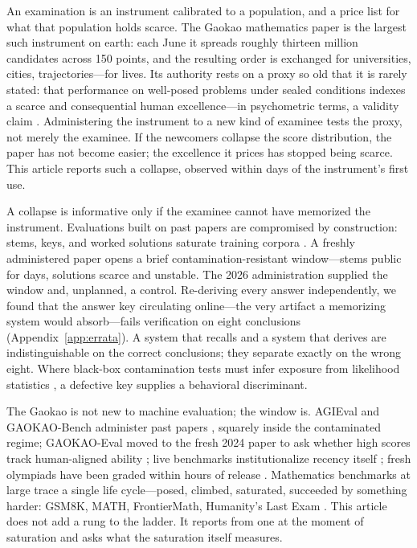 \documentclass[11pt]{article}
\theoremstyle{plain}
\begin{document}
An examination is an instrument calibrated to a population, and a price
list for what that population holds scarce. The Gaokao mathematics paper
is the largest such instrument on earth: each June it spreads roughly
thirteen million candidates across 150 points, and the resulting order is
exchanged for universities, cities, trajectories---for lives. Its
authority rests on a proxy so old that it is rarely stated: that
performance on well-posed problems under sealed conditions indexes a
scarce and consequential human excellence---in psychometric terms, a
validity claim \citep{cronbach1955construct}. Administering the instrument to
a new kind of examinee tests the proxy, not merely the examinee. If the
newcomers collapse the score distribution, the paper has not become
easier; the excellence it prices has stopped being scarce. This article
reports such a collapse, observed within days of the instrument's first
use.

A collapse is informative only if the examinee cannot have memorized the
instrument. Evaluations built on past papers are compromised by
construction: stems, keys, and worked solutions saturate training corpora
\citep{carlini2023quantifying,zhang2024careful}.
A freshly administered paper opens a brief contamination-resistant
window---stems public for days, solutions scarce and unstable. The 2026
administration supplied the window and, unplanned, a control. Re-deriving
every answer independently, we found that the answer key circulating
online---the very artifact a memorizing system would absorb---fails
verification on eight conclusions (Appendix~\ref{app:errata}). A system
that recalls and a system that derives are indistinguishable on the
correct conclusions; they separate exactly on the wrong eight. Where
black-box contamination tests must infer exposure from likelihood
statistics \citep{oren2024proving}, a defective key supplies a behavioral
discriminant.

The Gaokao is not new to machine evaluation; the window is. AGIEval and
GAOKAO-Bench administer past papers
\citep{zhong2023agieval,zhang2023gaokaobench}, squarely inside the
contaminated regime; GAOKAO-Eval moved to the fresh 2024 paper to ask
whether high scores track human-aligned ability \citep{lei2024gaokaoeval};
live benchmarks institutionalize recency itself
\citep{white2025livebench,balunovic2025matharena}; fresh olympiads have
been graded within hours of release \citep{petrov2025proof}. Mathematics
benchmarks at large trace a single life cycle---posed, climbed, saturated,
succeeded by something harder: GSM8K, MATH, FrontierMath, Humanity's Last
Exam \citep{cobbe2021gsm8k,hendrycks2021math,glazer2024frontiermath,
phan2025hle}. This article does not add a rung to the ladder. It reports
from one at the moment of saturation and asks what the saturation itself
measures.
\end{document}
